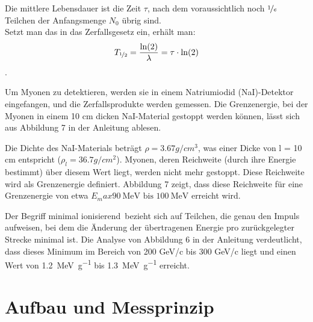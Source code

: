 \documentclass[12pt,a4paper,ngerman]{report}
\begin{document}
		Die mittlere Lebensdauer ist die Zeit $\tau$, nach dem voraussichtlich noch $\nicefrac{1}{e}$ Teilchen der Anfangsmenge $N_0$ übrig sind. \\
		Setzt man das in das Zerfallsgesetz ein, erhält man:
		\[T_{\nicefrac{1}{2}} = \frac{\ln(2)}{\lambda} = \tau \cdot \ln(2) \].
		
		Um Myonen zu detektieren, werden sie in einem Natriumiodid (NaI)-Detektor eingefangen, und die Zerfallsprodukte werden gemessen. Die Grenzenergie, bei der Myonen in einem 10 cm dicken NaI-Material gestoppt werden können, lässt sich aus Abbildung 7 in der Anleitung  \cite{Anleitung} ablesen.
		
		Die Dichte des NaI-Materials beträgt $\rho = 3.67 g/cm^3$, was einer Dicke von l = 10 cm entspricht ($\rho_l = 36.7 g/cm^2$). Myonen, deren Reichweite (durch ihre Energie bestimmt) über diesem Wert liegt, werden nicht mehr gestoppt. Diese Reichweite wird als Grenzenergie definiert. Abbildung 7 zeigt, dass diese Reichweite für eine Grenzenergie von etwa $E_max  \qty{90}{\mega\electronvolt} \text{ bis } \qty{100}{\mega\electronvolt}$ erreicht wird.
		
		Der Begriff \glqq minimal ionisierend\grqq ~bezieht sich auf Teilchen, die genau den Impuls aufweisen, bei dem die Änderung der übertragenen Energie pro zurückgelegter Strecke minimal ist. Die Analyse von Abbildung 6 in der Anleitung verdeutlicht, dass dieses Minimum im Bereich von 200 GeV/c bis 300 GeV/c liegt und einen Wert von \qty{1.2}{\mega \electronvolt\per\gram} bis \qty{1.3}{\mega \electronvolt\per\gram} erreicht.
		

\chapter{Aufbau und Messprinzip}
\end{document}
